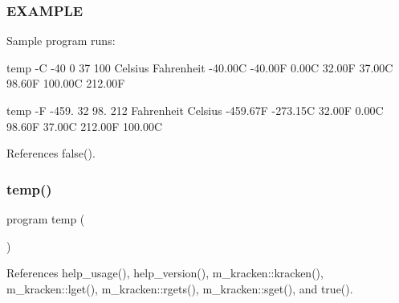 \subsubsection*{E\+X\+A\+M\+P\+LE}

Sample program runs\+:

temp -\/C -\/40 0 37 100 Celsius Fahrenheit -\/40.\+00C -\/40.\+00F 0.\+00C 32.\+00F 37.\+00C 98.\+60F 100.\+00C 212.\+00F

temp -\/F -\/459. 32 98. 212 Fahrenheit Celsius -\/459.\+67F -\/273.\+15C 32.\+00F 0.\+00C 98.\+60F 37.\+00C 212.\+00F 100.\+00C 

References false().

\mbox{\label{temp_8f90_ae3dd9015488975da65db0e05e1d019c3}} 
\subsubsection{\texorpdfstring{temp()}{temp()}}
{\footnotesize\ttfamily program temp (\begin{DoxyParamCaption}{ }\end{DoxyParamCaption})}



References help\+\_\+usage(), help\+\_\+version(), m\+\_\+kracken\+::kracken(), m\+\_\+kracken\+::lget(), m\+\_\+kracken\+::rgets(), m\+\_\+kracken\+::sget(), and true().

